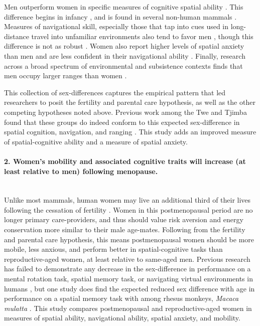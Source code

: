 Men outperform women in specific measures of cognitive spatial ability \citep{sanders1982sex, shepard1971mental, eals1994hunter, lawton2010gender}.  This difference begins in infancy \citep{quinn2008sex, moore2008mental, levine1999early}, and is found in several non-human mammals \citep{javsarevic2012spatial, perdue2011sex, gaulin1986sex}.  Measures of navigational skill, especially those that tap into cues used in long-distance travel into unfamiliar environments also tend to favor men \citep{moffat1998navigation, bryant1982personality, galea1993sex, henrie1997gender}, though this difference is not as robust \citep{burke2012women, gilmartin1984comparing, montello1999comparison}.  Women also report higher levels of spatial anxiety than men and are less confident in their navigational ability \citep{devlin1995interactive, lawton1994gender, picucci2011besides}.  Finally, research across a broad spectrum of environmental and subsistence contexts finds that men occupy larger ranges than women \citep{ecuyer2004have, gaulin1988evolution, macdonald1999reproductive}.

This collection of sex-differences captures the empirical pattern that led researchers to posit the fertility and parental care hypothesis, as well as the other competing hypotheses noted above.  Previous work among the Twe and Tjimba found that these groups do indeed conform to this expected sex-difference in spatial cognition, navigation, and ranging \citep{vashro2014spatial}.  This study adds an improved measure of spatial-cognitive ability and a measure of spatial anxiety.

\paragraph{2.  Women's mobility and associated cognitive traits will increase (at least relative to men) following menopause.}\mbox{}\\

Unlike most mammals, human women may live an additional third of their lives following the cessation of fertility \citep{hawkes2003grandmothers}.  Women in this postmenopausal period are no longer primary care-providers, and thus should value risk aversion and energy conservation more similar to their male age-mates.  Following from the fertility and parental care hypothesis, this means postmenopausal women should be more mobile, less anxious, and perform better in spatial-cognitive tasks than reproductive-aged women, at least relative to same-aged men.  Previous research has failed to demonstrate any decrease in the sex-difference in performance on a mental rotation task, spatial memory task, or navigating virtual environments in humans \citep{willis1988gender, driscoll2005virtual, moffat2001age}, but one study does find the expected reduced sex difference with age in performance on a spatial memory task with among rhesus monkeys, \emph{Macaca mulatta} \cite{lacreuse1999spatial}.  This study compares postmenopausal and reproductive-aged women in measures of spatial ability, navigational ability, spatial anxiety, and mobility.    

